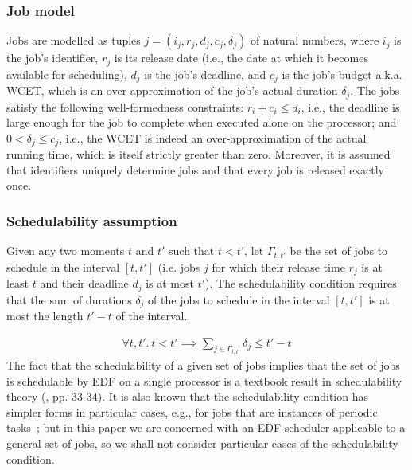 	\subsubsection{Job model}
	\label{sec:jobmodel}
	Jobs are modelled as tuples $j = (i_j, r_j,d_j,c_j, \delta_j)$  of natural numbers, where $i_j$ is the job's identifier, $r_j$ is its release date (i.e., the date at which it becomes available for scheduling), $d_j$ is the job's deadline, and $c_j$ is the job's budget a.k.a. WCET, which is an over-approximation of the job's actual duration $\delta_j$. The jobs satisfy the following well-formedness constraints:
	$r_i + c_i \leq d_i$, i.e., the deadline is large enough for the job to complete when executed alone on the processor; and $0 < \delta_j \leq c_j$, i.e., the WCET is indeed an over-approximation of the actual running time, which is itself strictly greater than zero. Moreover, it is assumed that identifiers uniquely determine jobs and that every job is released exactly once.


	\subsubsection{Schedulability assumption}

	Given any two moments $t$ and $t'$ such that $t < t'$,
	let $\Gamma_{t, t'}$ be the set of jobs to schedule in the interval $[t, t']$
	(i.e. jobs $j$ for which their release time $r_j$ is at least $t$ and their deadline $d_j$ is at most $t'$).
	The schedulability condition requires that the sum of durations $\delta_j$ of the jobs to schedule in the interval $[t, t']$ is at most the length $t'-t$ of the interval.

	\begin{gather} \label{eq:schedulability}
    		\forall t, t'. ~t < t' \implies
    		\sum_{j \in \Gamma_{t, t'}}\delta_j \leq t' - t
	\end{gather}
	The fact that the schedulability of a given set of jobs implies that the set of jobs is schedulable by EDF on a single processor
	is a textbook result in schedulability theory (\cite{stankovic2012deadline}, pp. 33-34). It is also known that the schedulability condition has simpler forms in particular cases, e.g.,  for jobs that are instances of periodic tasks~\cite{stankovic2012deadline}; but in this paper we are concerned with an  EDF scheduler  applicable to a general set of jobs, so we shall not consider particular cases of the schedulability condition.

